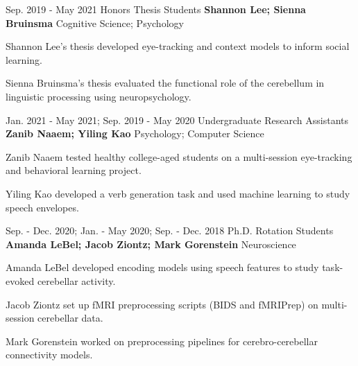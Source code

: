 

\begin{cventries}
 
  \cventry
    {Sep. 2019 - May 2021} %
    {Honors Thesis Students} %
    {\textbf{Shannon Lee; Sienna Bruinsma}} 
    {Cognitive Science; Psychology} %
    {
      \begin{cvitems} %
        \item {Shannon Lee's thesis developed eye-tracking and context models to inform social learning.}
        \item {Sienna Bruinsma's thesis evaluated the functional role of the cerebellum in linguistic processing using neuropsychology.}
      \end{cvitems}
    }
    
    
  \cventry
    {Jan. 2021 - May 2021; Sep. 2019 - May 2020} %
    {Undergraduate Research Assistants} %
   	{\textbf{Zanib Naaem; Yiling Kao}}
   	{Psychology; Computer Science}
    {
      \begin{cvitems} %
        \item {Zanib Naaem tested healthy college-aged students on a multi-session eye-tracking and behavioral learning project.}
        \item {Yiling Kao developed a verb generation task and used machine learning to study speech envelopes.}
      \end{cvitems}
    }
    
  \cventry
    {Sep. - Dec. 2020; Jan. - May 2020; Sep. - Dec. 2018} %
    {Ph.D. Rotation Students} %
    {\textbf{Amanda LeBel; Jacob Ziontz; Mark Gorenstein}}
    {Neuroscience}
   {
      \begin{cvitems} %
        \item {Amanda LeBel developed encoding models using speech features to study task-evoked cerebellar activity.}
        \item {Jacob Ziontz set up fMRI preprocessing scripts (BIDS and fMRIPrep) on multi-session cerebellar data.}
        \item {Mark Gorenstein worked on preprocessing pipelines for cerebro-cerebellar connectivity models.}
      \end{cvitems}
    }
    

\end{cventries}
